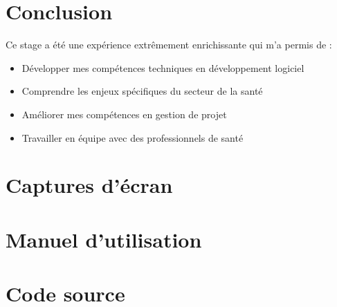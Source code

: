 \documentclass[12pt,a4paper]{report}
\begin{document}
\chapter{Conclusion}
Ce stage a été une expérience extrêmement enrichissante qui m'a permis de :
\begin{itemize}
    \item Développer mes compétences techniques en développement logiciel
    \item Comprendre les enjeux spécifiques du secteur de la santé
    \item Améliorer mes compétences en gestion de projet
    \item Travailler en équipe avec des professionnels de santé
\end{itemize}

\appendix
\chapter{Captures d'écran}
\chapter{Manuel d'utilisation}
\chapter{Code source}
\end{document}
